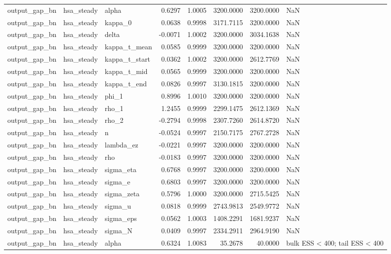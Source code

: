 \begin{tabular}{lllrrrrl}
output\_gap\_bn & hsa\_steady & alpha & 0.6297 & 1.0005 & 3200.0000 & 3200.0000 & NaN \\
output\_gap\_bn & hsa\_steady & kappa\_0 & 0.0638 & 0.9998 & 3171.7115 & 3200.0000 & NaN \\
output\_gap\_bn & hsa\_steady & delta & -0.0071 & 1.0002 & 3200.0000 & 3034.1638 & NaN \\
output\_gap\_bn & hsa\_steady & kappa\_t\_mean & 0.0585 & 0.9999 & 3200.0000 & 3200.0000 & NaN \\
output\_gap\_bn & hsa\_steady & kappa\_t\_start & 0.0362 & 1.0002 & 3200.0000 & 2612.7769 & NaN \\
output\_gap\_bn & hsa\_steady & kappa\_t\_mid & 0.0565 & 0.9999 & 3200.0000 & 3200.0000 & NaN \\
output\_gap\_bn & hsa\_steady & kappa\_t\_end & 0.0826 & 0.9997 & 3130.1815 & 3200.0000 & NaN \\
output\_gap\_bn & hsa\_steady & phi\_1 & 0.8996 & 1.0010 & 3200.0000 & 3200.0000 & NaN \\
output\_gap\_bn & hsa\_steady & rho\_1 & 1.2455 & 0.9999 & 2299.1475 & 2612.1369 & NaN \\
output\_gap\_bn & hsa\_steady & rho\_2 & -0.2794 & 0.9998 & 2307.7260 & 2614.8720 & NaN \\
output\_gap\_bn & hsa\_steady & n & -0.0524 & 0.9997 & 2150.7175 & 2767.2728 & NaN \\
output\_gap\_bn & hsa\_steady & lambda\_ez & -0.0221 & 0.9997 & 3200.0000 & 3200.0000 & NaN \\
output\_gap\_bn & hsa\_steady & rho & -0.0183 & 0.9997 & 3200.0000 & 3200.0000 & NaN \\
output\_gap\_bn & hsa\_steady & sigma\_eta & 0.6768 & 0.9997 & 3200.0000 & 3200.0000 & NaN \\
output\_gap\_bn & hsa\_steady & sigma\_e & 0.6803 & 0.9997 & 3200.0000 & 3200.0000 & NaN \\
output\_gap\_bn & hsa\_steady & sigma\_zeta & 0.5796 & 1.0000 & 3200.0000 & 2715.5425 & NaN \\
output\_gap\_bn & hsa\_steady & sigma\_u & 0.0818 & 0.9999 & 2743.9813 & 2549.9772 & NaN \\
output\_gap\_bn & hsa\_steady & sigma\_eps & 0.0562 & 1.0003 & 1408.2291 & 1681.9237 & NaN \\
output\_gap\_bn & hsa\_steady & sigma\_N & 0.0409 & 0.9997 & 2334.2911 & 2964.9190 & NaN \\
output\_gap\_bn & hsa\_steady & alpha & 0.6324 & 1.0083 & 35.2678 & 40.0000 & bulk ESS < 400; tail ESS < 400 \\

\end{tabular}
